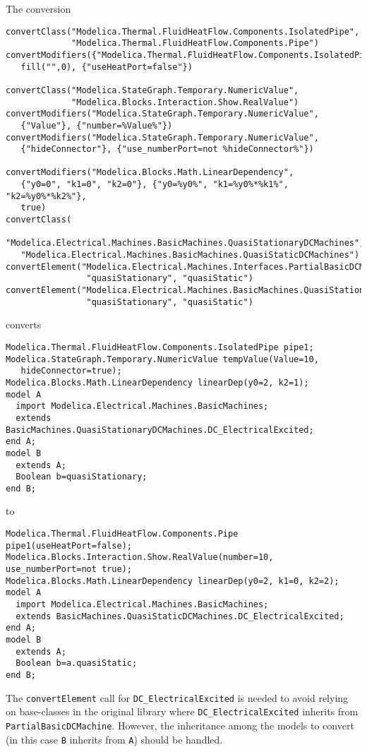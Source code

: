 \begin{example}
The conversion
\begin{lstlisting}[language=modelica]
convertClass("Modelica.Thermal.FluidHeatFlow.Components.IsolatedPipe",
             "Modelica.Thermal.FluidHeatFlow.Components.Pipe")
convertModifiers({"Modelica.Thermal.FluidHeatFlow.Components.IsolatedPipe"},
   fill("",0), {"useHeatPort=false"})

convertClass("Modelica.StateGraph.Temporary.NumericValue",
             "Modelica.Blocks.Interaction.Show.RealValue")
convertModifiers("Modelica.StateGraph.Temporary.NumericValue",
   {"Value"}, {"number=%Value%"})
convertModifiers("Modelica.StateGraph.Temporary.NumericValue",
   {"hideConnector"}, {"use_numberPort=not %hideConnector%"})

convertModifiers("Modelica.Blocks.Math.LinearDependency",
   {"y0=0", "k1=0", "k2=0"}, {"y0=%y0%", "k1=%y0%*%k1%", "k2=%y0%*%k2%"},
   true)
convertClass(
   "Modelica.Electrical.Machines.BasicMachines.QuasiStationaryDCMachines",
   "Modelica.Electrical.Machines.BasicMachines.QuasiStaticDCMachines")
convertElement("Modelica.Electrical.Machines.Interfaces.PartialBasicDCMachine",
                "quasiStationary", "quasiStatic")
convertElement("Modelica.Electrical.Machines.BasicMachines.QuasiStationaryDCMachines.DC_ElectricalExcited",
                "quasiStationary", "quasiStatic")
\end{lstlisting}
converts
\begin{lstlisting}[language=modelica]
Modelica.Thermal.FluidHeatFlow.Components.IsolatedPipe pipe1;
Modelica.StateGraph.Temporary.NumericValue tempValue(Value=10,
   hideConnector=true);
Modelica.Blocks.Math.LinearDependency linearDep(y0=2, k2=1);
model A
  import Modelica.Electrical.Machines.BasicMachines;
  extends BasicMachines.QuasiStationaryDCMachines.DC_ElectricalExcited;
end A;
model B
  extends A;
  Boolean b=quasiStationary;
end B;
\end{lstlisting}
to
\begin{lstlisting}[language=modelica]
Modelica.Thermal.FluidHeatFlow.Components.Pipe pipe1(useHeatPort=false);
Modelica.Blocks.Interaction.Show.RealValue(number=10, use_numberPort=not true);
Modelica.Blocks.Math.LinearDependency linearDep(y0=2, k1=0, k2=2);
model A
  import Modelica.Electrical.Machines.BasicMachines;
  extends BasicMachines.QuasiStaticDCMachines.DC_ElectricalExcited;
end A;
model B
  extends A;
  Boolean b=a.quasiStatic;
end B;
\end{lstlisting}
The \lstinline!convertElement! call for \lstinline!DC_ElectricalExcited! is needed to avoid relying on base-classes
in the original library where \lstinline!DC_ElectricalExcited! inherits from \lstinline!PartialBasicDCMachine!.
However, the inheritance among the models to convert (in this case \lstinline!B! inherits from \lstinline!A!) should be handled.
\end{example}

